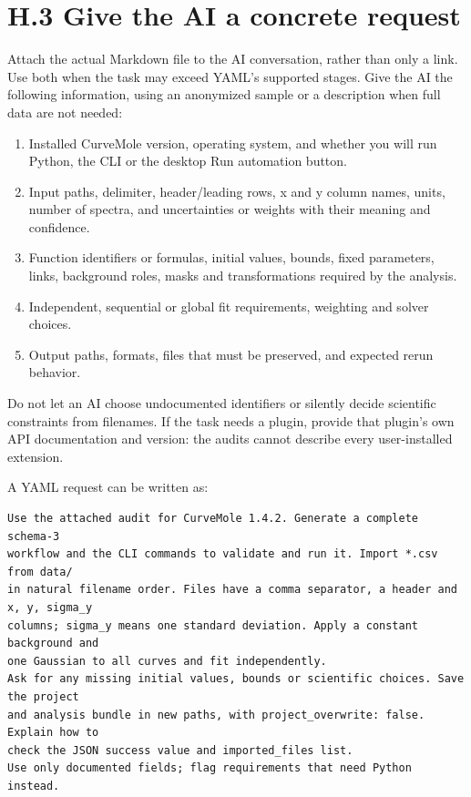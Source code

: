 \documentclass[
  10pt,
  a4paper,
  oneside]{scrreprt}
\providecommand{\tightlist}{%
  \setlength{\itemsep}{0pt}\setlength{\parskip}{0pt}}
\begin{document}
\hypertarget{h.3-give-the-ai-a-concrete-request}{%
\section{H.3 Give the AI a concrete
request}\label{h.3-give-the-ai-a-concrete-request}}

Attach the actual Markdown file to the AI conversation, rather than only
a link. Use both when the task may exceed YAML's supported stages. Give
the AI the following information, using an anonymized sample or a
description when full data are not needed:

\begin{enumerate}
\def\labelenumi{\arabic{enumi}.}
\tightlist
\item
  Installed CurveMole version, operating system, and whether you will
  run Python, the CLI or the desktop Run automation button.
\item
  Input paths, delimiter, header/leading rows, x and y column names,
  units, number of spectra, and uncertainties or weights with their
  meaning and confidence.
\item
  Function identifiers or formulas, initial values, bounds, fixed
  parameters, links, background roles, masks and transformations
  required by the analysis.
\item
  Independent, sequential or global fit requirements, weighting and
  solver choices.
\item
  Output paths, formats, files that must be preserved, and expected
  rerun behavior.
\end{enumerate}

Do not let an AI choose undocumented identifiers or silently decide
scientific constraints from filenames. If the task needs a plugin,
provide that plugin's own API documentation and version: the audits
cannot describe every user-installed extension.

A YAML request can be written as:

\begin{verbatim}
Use the attached audit for CurveMole 1.4.2. Generate a complete schema-3
workflow and the CLI commands to validate and run it. Import *.csv from data/
in natural filename order. Files have a comma separator, a header and x, y, sigma_y
columns; sigma_y means one standard deviation. Apply a constant background and
one Gaussian to all curves and fit independently.
Ask for any missing initial values, bounds or scientific choices. Save the project
and analysis bundle in new paths, with project_overwrite: false. Explain how to
check the JSON success value and imported_files list.
Use only documented fields; flag requirements that need Python instead.
\end{verbatim}
\end{document}
